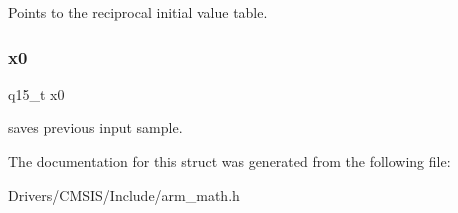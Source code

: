 Points to the reciprocal initial value table. \mbox{\label{structarm__lms__norm__instance__q15_a3c975fed200b19723a2ed11efccca6cd}} 
\subsubsection{\texorpdfstring{x0}{x0}}
{\footnotesize\ttfamily q15\+\_\+t x0}

saves previous input sample. 

The documentation for this struct was generated from the following file\+:\begin{DoxyCompactItemize}
\item 
Drivers/\+C\+M\+S\+I\+S/\+Include/arm\+\_\+math.\+h\end{DoxyCompactItemize}
